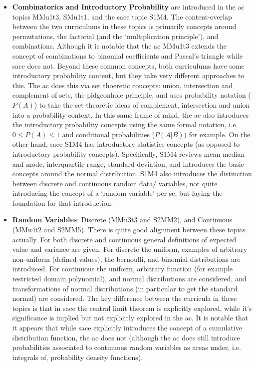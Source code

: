 \documentclass[twoside,12pt,a4paper]{report}
\begin{document}
\begin{itemize}
	\item \textbf{Combinatorics and Introductory Probability} are introduced in the \gls{ac} topics MMu1t3, SMu1t1, and the \gls{sace} topic S1M4. The content-overlap between the two curriculums in these topics is primarily concepts around permutations, the factorial (and the `multiplication principle'), and combinations. Although it is notable that the \gls{ac} MMu1t3 extends the concept of combinations to binomial coefficients and Pascal's triangle while \gls{sace} does not. Beyond these common concepts, both curriculums have some introductory probability content, but they take very different approaches to this. The \gls{ac} does this via set thoeretic concepts: union, intersection and complement of sets, the pidgeonhole principle, and uses probability notation ($P(A)$) to take the set-theoretic ideas of complement, intersection and union into a probability context. In this same frame of mind, the \gls{ac} also introduces the introductory probability concepts using the same formal notation, i.e. $0 \leq P(A) \leq 1$ and conditional probabilities ($P(A|B)$) for example. On the other hand, \gls{sace} S1M4 has introductory statistics concepts (as opposed to introductory probability concepts). Specifically, S1M4 reviews mean median and mode, interquartile range, standard deviation, and introduces the basic concepts around the normal distribution. S1M4 also introduces the distinction between discrete and continuous random data/ variables, not quite introducing the concept of a `random variable' per se, but laying the foundation for that introduction.  
	\item \textbf{Random Variables}: Discrete (MMu3t3 and S2MM2), and Continuous (MMu4t2 and S2MM5). There is quite good alignment between these topics actually. For both discrete and continuous general definitions of expected value and variance are given. For discrete the uniform, examples of arbitrary non-uniform (defined values), the bernoulli, and binomial distributions are introduced. For continuous the uniform, arbitrary function (for example restricted domain polynomial), and normal distributions are considered, and transformations of normal distributions (in particular to get the standard normal) are considered. The key difference between the curricula in these topics is that in \gls{sace} the central limit theorem is explicitly explored, while it's significance is implied but not explicitly explored in the \gls{ac}. It is notable that it appears that while \gls{sace} explicitly introduces the concept of a cumulative distribution function, the \gls{ac} does not (although the \gls{ac} does still introduce probabilities associated to continuous random variables as areas under, i.e. integrals of, probability density functions).

\end{itemize}
\end{document}
